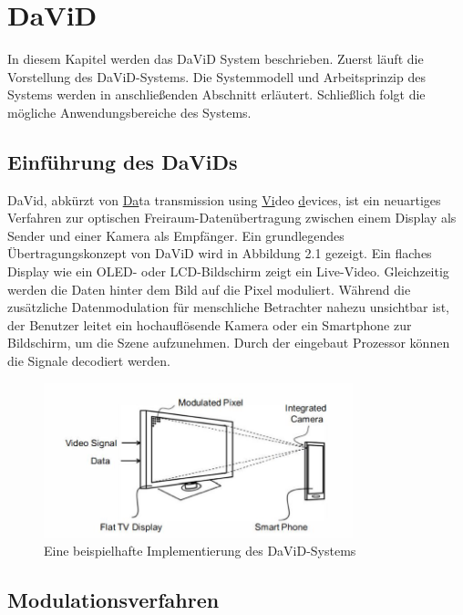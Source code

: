 \chapter{DaViD} \label{cha:David}

In diesem Kapitel werden das DaViD System beschrieben. Zuerst läuft die Vorstellung des DaViD-Systems. Die Systemmodell und Arbeitsprinzip des Systems werden in anschließenden Abschnitt erläutert. Schließlich folgt die mögliche Anwendungsbereiche des Systems.

\section{Einführung des DaViDs} 

DaVid, abkürzt von \uline{Da}ta transmission using \uline{Vi}deo \uline{d}evices, ist ein neuartiges Verfahren zur optischen Freiraum-Datenübertragung zwischen einem Display als Sender und einer Kamera als Empfänger. Ein grundlegendes Übertragungskonzept von DaViD wird in Abbildung 2.1 gezeigt. Ein flaches Display wie ein OLED- oder LCD-Bildschirm zeigt ein Live-Video. Gleichzeitig werden die Daten hinter dem Bild auf die Pixel moduliert. Während die zusätzliche Datenmodulation für menschliche Betrachter nahezu unsichtbar ist, der Benutzer leitet ein hochauflösende Kamera oder ein Smartphone zur Bildschirm, um die Szene aufzunehmen. Durch der eingebaut Prozessor können die Signale decodiert werden.

\begin{figure}[htb]
 \centering 
 \includegraphics[keepaspectratio,width=0.8\textwidth]{images/David1.jpg}
 \caption{Eine beispielhafte Implementierung des DaViD-Systems}
 \label{fig:David1}
\end{figure}


\section{Modulationsverfahren} 

